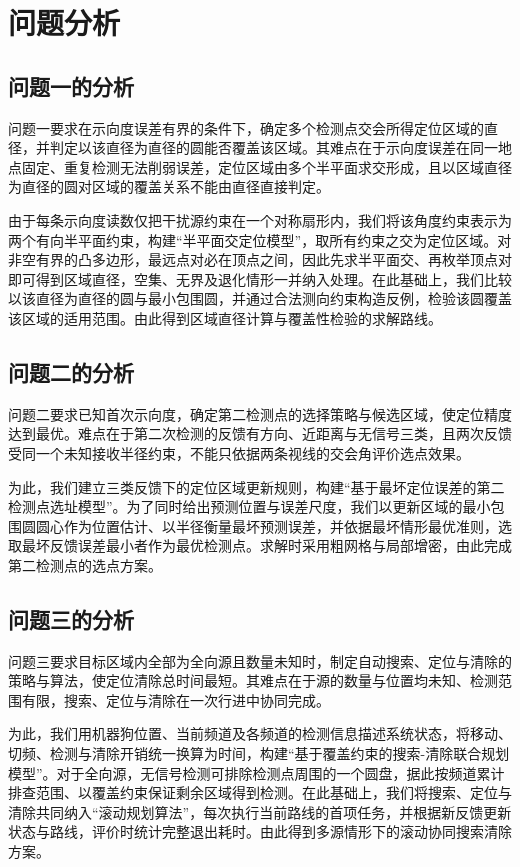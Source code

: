 \section{问题分析}

\subsection{问题一的分析}

问题一要求在示向度误差有界的条件下，确定多个检测点交会所得定位区域的直径，并判定以该直径为直径的圆能否覆盖该区域。其难点在于示向度误差在同一地点固定、重复检测无法削弱误差，定位区域由多个半平面求交形成，且以区域直径为直径的圆对区域的覆盖关系不能由直径直接判定。

由于每条示向度读数仅把干扰源约束在一个对称扇形内，我们将该角度约束表示为两个有向半平面约束，构建“半平面交定位模型”，取所有约束之交为定位区域。对非空有界的凸多边形，最远点对必在顶点之间，因此先求半平面交、再枚举顶点对即可得到区域直径，空集、无界及退化情形一并纳入处理。在此基础上，我们比较以该直径为直径的圆与最小包围圆，并通过合法测向约束构造反例，检验该圆覆盖该区域的适用范围。由此得到区域直径计算与覆盖性检验的求解路线。

\subsection{问题二的分析}

问题二要求已知首次示向度，确定第二检测点的选择策略与候选区域，使定位精度达到最优。难点在于第二次检测的反馈有方向、近距离与无信号三类，且两次反馈受同一个未知接收半径约束，不能只依据两条视线的交会角评价选点效果。

为此，我们建立三类反馈下的定位区域更新规则，构建“基于最坏定位误差的第二检测点选址模型”。为了同时给出预测位置与误差尺度，我们以更新区域的最小包围圆圆心作为位置估计、以半径衡量最坏预测误差，并依据最坏情形最优准则，选取最坏反馈误差最小者作为最优检测点。求解时采用粗网格与局部增密，由此完成第二检测点的选点方案。

\subsection{问题三的分析}

问题三要求目标区域内全部为全向源且数量未知时，制定自动搜索、定位与清除的策略与算法，使定位清除总时间最短。其难点在于源的数量与位置均未知、检测范围有限，搜索、定位与清除在一次行进中协同完成。

为此，我们用机器狗位置、当前频道及各频道的检测信息描述系统状态，将移动、切频、检测与清除开销统一换算为时间，构建“基于覆盖约束的搜索-清除联合规划模型”。对于全向源，无信号检测可排除检测点周围的一个圆盘，据此按频道累计排查范围、以覆盖约束保证剩余区域得到检测。在此基础上，我们将搜索、定位与清除共同纳入“滚动规划算法”，每次执行当前路线的首项任务，并根据新反馈更新状态与路线，评价时统计完整退出耗时。由此得到多源情形下的滚动协同搜索清除方案。


